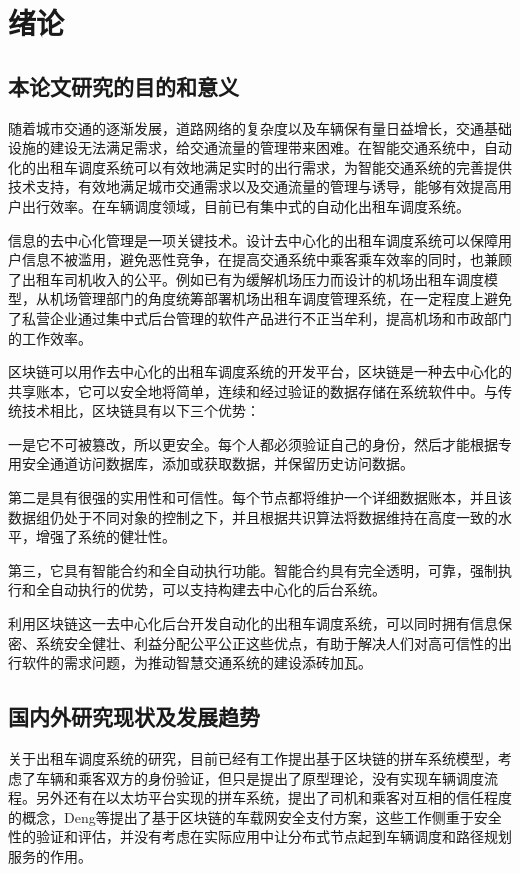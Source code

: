 \chapter{绪论}
\section{本论文研究的目的和意义}

随着城市交通的逐渐发展，道路网络的复杂度以及车辆保有量日益增长，交通基础设施的建设无法满足需求，给交通流量的管理带来困难。在智能交通系统中，自动化的出租车调度系统可以有效地满足实时的出行需求，为智能交通系统的完善提供技术支持，有效地满足城市交通需求以及交通流量的管理与诱导，能够有效提高用户出行效率。在车辆调度领域，目前已有集中式的自动化出租车调度系统。\par
信息的去中心化管理是一项关键技术。设计去中心化的出租车调度系统可以保障用户信息不被滥用，避免恶性竞争，在提高交通系统中乘客乘车效率的同时，也兼顾了出租车司机收入的公平。例如已有为缓解机场压力而设计的机场出租车调度模型，从机场管理部门的角度统筹部署机场出租车调度管理系统，在一定程度上避免了私营企业通过集中式后台管理的软件产品进行不正当牟利，提高机场和市政部门的工作效率。\par
区块链可以用作去中心化的出租车调度系统的开发平台，区块链是一种去中心化的共享账本，它可以安全地将简单，连续和经过验证的数据存储在系统软件中。与传统技术相比，区块链具有以下三个优势：\par
一是它不可被篡改，所以更安全。每个人都必须验证自己的身份，然后才能根据专用安全通道访问数据库，添加或获取数据，并保留历史访问数据。\par
第二是具有很强的实用性和可信性。每个节点都将维护一个详细数据账本，并且该数据组仍处于不同对象的控制之下，并且根据共识算法将数据维持在高度一致的水平，增强了系统的健壮性。\par
第三，它具有智能合约和全自动执行功能。智能合约具有完全透明，可靠，强制执行和全自动执行的优势，可以支持构建去中心化的后台系统。\par
利用区块链这一去中心化后台开发自动化的出租车调度系统，可以同时拥有信息保密、系统安全健壮、利益分配公平公正这些优点，有助于解决人们对高可信性的出行软件的需求问题，为推动智慧交通系统的建设添砖加瓦。


\section{国内外研究现状及发展趋势}
关于出租车调度系统的研究，目前已经有工作提出基于区块链的拼车系统模型，考虑了车辆和乘客双方的身份验证，但只是提出了原型理论，没有实现车辆调度流程。另外还有在以太坊平台实现的拼车系统，提出了司机和乘客对互相的信任程度的概念，Deng等提出了基于区块链的车载网安全支付方案，这些工作侧重于安全性的验证和评估，并没有考虑在实际应用中让分布式节点起到车辆调度和路径规划服务的作用。\par

